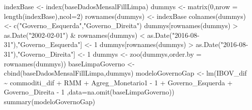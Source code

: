 \documentclass[
]{article}
\newenvironment{Shaded}{\begin{snugshade}}{\end{snugshade}}
\newcommand{\AttributeTok}[1]{\textcolor[rgb]{0.77,0.63,0.00}{#1}}
\newcommand{\DecValTok}[1]{\textcolor[rgb]{0.00,0.00,0.81}{#1}}
\newcommand{\FunctionTok}[1]{\textcolor[rgb]{0.00,0.00,0.00}{#1}}
\newcommand{\NormalTok}[1]{#1}
\newcommand{\OtherTok}[1]{\textcolor[rgb]{0.56,0.35,0.01}{#1}}
\newcommand{\SpecialCharTok}[1]{\textcolor[rgb]{0.00,0.00,0.00}{#1}}
\newcommand{\StringTok}[1]{\textcolor[rgb]{0.31,0.60,0.02}{#1}}
\begin{document}
\begin{Shaded}
\begin{Highlighting}[]
\NormalTok{indexBase }\OtherTok{\textless{}{-}} \FunctionTok{index}\NormalTok{(baseDadosMensalFillLimpa)}
\NormalTok{dummys }\OtherTok{\textless{}{-}} \FunctionTok{matrix}\NormalTok{(}\DecValTok{0}\NormalTok{,}\AttributeTok{nrow =} \FunctionTok{length}\NormalTok{(indexBase),}\AttributeTok{ncol=}\DecValTok{2}\NormalTok{)}
\FunctionTok{rownames}\NormalTok{(dummys) }\OtherTok{\textless{}{-}}\NormalTok{ indexBase}
\FunctionTok{colnames}\NormalTok{(dummys) }\OtherTok{\textless{}{-}} \FunctionTok{c}\NormalTok{(}\StringTok{"Governo\_Esquerda"}\NormalTok{,}\StringTok{"Governo\_Direita"}\NormalTok{)}
\NormalTok{dummys[}\FunctionTok{rownames}\NormalTok{(dummys) }\SpecialCharTok{\textgreater{}} \FunctionTok{as.Date}\NormalTok{(}\StringTok{"2002{-}02{-}01"}\NormalTok{) }\SpecialCharTok{\&} \FunctionTok{rownames}\NormalTok{(dummys) }\SpecialCharTok{\textless{}} \FunctionTok{as.Date}\NormalTok{(}\StringTok{"2016{-}08{-}31"}\NormalTok{),}\StringTok{"Governo\_Esquerda"}\NormalTok{] }\OtherTok{\textless{}{-}} \DecValTok{1}
\NormalTok{dummys[}\FunctionTok{rownames}\NormalTok{(dummys) }\SpecialCharTok{\textgreater{}} \FunctionTok{as.Date}\NormalTok{(}\StringTok{"2016{-}08{-}31"}\NormalTok{),}\StringTok{"Governo\_Direita"}\NormalTok{] }\OtherTok{\textless{}{-}} \DecValTok{1}
\NormalTok{dummys }\OtherTok{\textless{}{-}} \FunctionTok{zoo}\NormalTok{(dummys,}\AttributeTok{order.by =} \FunctionTok{rownames}\NormalTok{(dummys))}
\NormalTok{baseLimpaGoverno }\OtherTok{\textless{}{-}} \FunctionTok{cbind}\NormalTok{(baseDadosMensalFillLimpa,dummys)}
\NormalTok{modeloGovernoGap }\OtherTok{\textless{}{-}} \FunctionTok{lm}\NormalTok{(IBOV\_dif }\SpecialCharTok{\textasciitilde{}}\NormalTok{ commoditi\_dif }\SpecialCharTok{+}\NormalTok{ RMM }\SpecialCharTok{+}\NormalTok{ Agreg\_Monetario1 }\SpecialCharTok{{-}} \DecValTok{1} \SpecialCharTok{+}\NormalTok{ Governo\_Esquerda }\SpecialCharTok{+}\NormalTok{ Governo\_Direita }\SpecialCharTok{{-}} \DecValTok{1}
\NormalTok{  ,}\AttributeTok{data=}\FunctionTok{na.omit}\NormalTok{(baseLimpaGoverno))}
\FunctionTok{summary}\NormalTok{(modeloGovernoGap)}
\end{Highlighting}
\end{Shaded}
\end{document}
